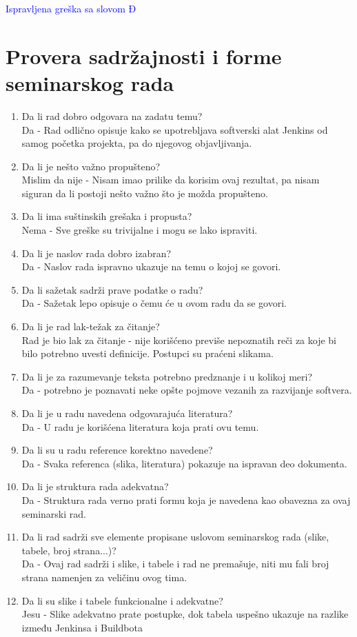 \documentclass[a4paper]{report}
\newcommand{\odgovor}[1]{\textcolor{blue}{#1}}
\begin{document}
\odgovor{Ispravljena greška sa slovom Đ}

\section{Provera sadržajnosti i forme seminarskog rada}

\begin{enumerate}
\item Da li rad dobro odgovara na zadatu temu?\\
	Da - Rad odlično opisuje kako se upotrebljava softverski alat Jenkins od samog početka projekta, pa do njegovog objavljivanja.
\item Da li je nešto važno propušteno?\\
	Mislim da nije - Nisam imao prilike da korisim ovaj rezultat, pa nisam siguran da li postoji nešto važno što je možda propušteno.
\item Da li ima suštinskih grešaka i propusta?\\
	Nema - Sve greške su trivijalne i mogu se lako ispraviti.
\item Da li je naslov rada dobro izabran?\\
	Da - Naslov rada ispravno ukazuje na temu o kojoj se govori.
\item Da li sažetak sadrži prave podatke o radu?\\
	Da - Sažetak lepo opisuje o čemu će u ovom radu da se govori.
\item Da li je rad lak-težak za čitanje?\\
	Rad je bio lak za čitanje - nije korišćeno previše nepoznatih reči za koje bi bilo potrebno uvesti definicije. Postupci su praćeni slikama.
\item Da li je za razumevanje teksta potrebno predznanje i u kolikoj meri?\\
	Da - potrebno je poznavati neke opšte pojmove vezanih za razvijanje softvera.
\item Da li je u radu navedena odgovarajuća literatura?\\
	Da - U radu je korišćena literatura koja prati ovu temu.
\item Da li su u radu reference korektno navedene?\\
	Da -  Svaka referenca (slika, literatura) pokazuje na ispravan deo dokumenta.
\item Da li je struktura rada adekvatna?\\
	Da - Struktura rada verno prati formu koja je navedena kao obavezna za ovaj seminarski rad.
\item Da li rad sadrži sve elemente propisane uslovom seminarskog rada (slike, tabele, broj strana...)?\\
	Da - Ovaj rad sadrži i slike, i tabele i rad ne premašuje, niti mu fali broj strana namenjen za veličinu ovog tima.
\item Da li su slike i tabele funkcionalne i adekvatne?\\
	Jesu - Slike adekvatno prate postupke, dok tabela uspešno ukazuje na razlike između Jenkinsa i Buildbota
\end{enumerate}
\end{document}
